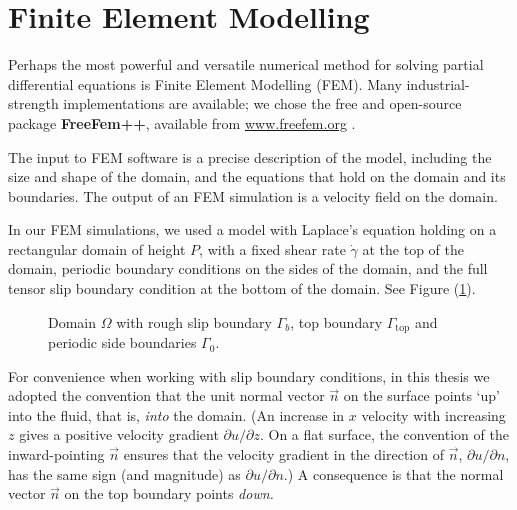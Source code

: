 \documentclass[12pt, a4paper, twoside, openright]{book}
\begin{document}
\section{Finite Element Modelling}

Perhaps the most powerful and versatile numerical method for solving partial differential equations is Finite Element Modelling (FEM).  Many industrial-strength implementations are available; we chose the free and open-source package \textbf{FreeFem++}, available from \url{www.freefem.org} \cite{freefem++}.

The input to FEM software is a precise description of the model, including the size and shape of the domain, and the equations that hold on the domain and its boundaries. The output of an FEM simulation is a velocity field on the domain.  

In our FEM simulations, we used a model with Laplace's equation holding on a rectangular domain of height $P$, with a fixed shear rate $\dot{\gamma} $ at the top of the domain, periodic boundary conditions on the sides of the domain, and the full tensor slip boundary condition at the bottom of the domain.  See Figure (\ref{FEMdomain}).

\begin{figure}[ht]
\centering
{}
\caption{Domain $\Omega$ with rough slip boundary $ \Gamma_b $, top boundary $\Gamma_{\mathrm{top}}$ and periodic side boundaries $\Gamma_0$.}\label{FEMdomain}
\end{figure}

For convenience when working with slip boundary conditions, in this thesis we adopted the convention that the unit normal vector $\vec{n}$ on the surface points `up' into the fluid, that is, \emph{into} the domain. (An increase in $x$ velocity with increasing $z$ gives a positive velocity gradient $\partial u /\partial z$.  On a flat surface, the convention of the inward-pointing $\vec{n}$ ensures that the velocity gradient in the direction of $\vec{n}$, $\partial u/\partial n$, has the same sign (and magnitude) as $\partial u/ \partial n$.)  A consequence is that the normal vector $\vec{n}$ on the top boundary points \emph{down.}
\end{document}
